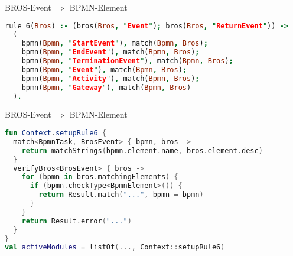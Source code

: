 \begin{frame}[fragile]{BROS-Event $\Rightarrow$ BPMN-Element}
\begin{lstlisting}[language=Prolog]
rule_6(Bros) :- (bros(Bros, "Event"); bros(Bros, "ReturnEvent")) ->
  (
    bpmn(Bpmn, "StartEvent"), match(Bpmn, Bros);
    bpmn(Bpmn, "EndEvent"), match(Bpmn, Bros);
    bpmn(Bpmn, "TerminationEvent"), match(Bpmn, Bros);
    bpmn(Bpmn, "Event"), match(Bpmn, Bros);
    bpmn(Bpmn, "Activity"), match(Bpmn, Bros);
    bpmn(Bpmn, "Gateway"), match(Bpmn, Bros)
  ).
\end{lstlisting}
\end{frame}

\begin{frame}[fragile]{BROS-Event $\Rightarrow$ BPMN-Element}
\begin{lstlisting}[language=Kotlin]
fun Context.setupRule6 {
  match<BpmnTask, BrosEvent> { bpmn, bros ->
    return matchStrings(bpmn.element.name, bros.element.desc)
  }
  verifyBros<BrosEvent> { bros ->
    for (bpmn in bros.matchingElements) {
      if (bpmn.checkType<BpmnElement>()) {
        return Result.match("...", bpmn = bpmn)
      }
    }
    return Result.error("...")
  }
}
val activeModules = listOf(..., Context::setupRule6)
\end{lstlisting}
\end{frame}
